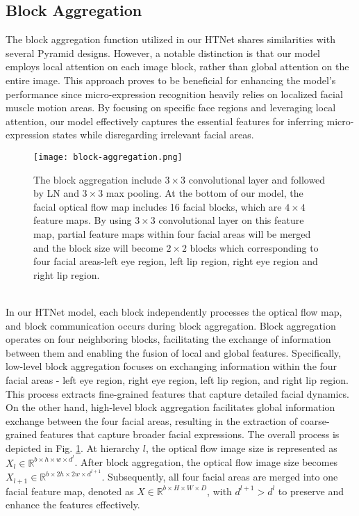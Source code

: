\documentclass[review,12pt, 3p]{elsarticle}
\begin{document}
\subsection{Block Aggregation}
The block aggregation function utilized in our HTNet shares similarities with several Pyramid designs. However, a notable distinction is that our model employs local attention on each image block, rather than global attention on the entire image. This approach proves to be beneficial for enhancing the model's performance since micro-expression recognition heavily relies on localized facial muscle motion areas. By focusing on specific face regions and leveraging local attention, our model effectively captures the essential features for inferring micro-expression states while disregarding irrelevant facial areas.\\
\begin{figure*}[t]
\centering
  \texttt{[image: block-aggregation.png]}
  \caption{The block aggregation include $3 \times 3$ convolutional layer and followed by LN and $3 \times 3$ max pooling. At the bottom of our model, the facial optical flow map includes 16 facial blocks, which are $4 \times 4$ feature maps. By using  $3 \times 3$ convolutional layer on this feature map, partial feature maps within four facial areas will be merged and the block size will become $2 \times 2$ blocks which corresponding to four facial areas-left eye region, left lip region, right eye region and right lip region.}
  \label{block-aggregation}
\end{figure*}\\
In our HTNet model, each block independently processes the optical flow map, and block communication occurs during block aggregation. Block aggregation operates on four neighboring blocks, facilitating the exchange of information between them and enabling the fusion of local and global features. Specifically, low-level block aggregation focuses on exchanging information within the four facial areas - left eye region, right eye region, left lip region, and right lip region. This process extracts fine-grained features that capture detailed facial dynamics. On the other hand, high-level block aggregation facilitates global information exchange between the four facial areas, resulting in the extraction of coarse-grained features that capture broader facial expressions. The overall process is depicted in Fig. \ref{block-aggregation}. At hierarchy $l$, the optical flow image size is represented as $X_l \in \mathbb{R}^{b \times h \times w \times d^{l}}$. After block aggregation, the optical flow image size becomes $X_{l+1} \in \mathbb{R}^{b \times 2h \times 2w \times d^{l+1}}$. Subsequently, all four facial areas are merged into one facial feature map, denoted as $X \in \mathbb{R}^{b \times H \times W \times D}$, with $d^{l+1} > d^{l}$ to preserve and enhance the features effectively.\\
\end{document}
